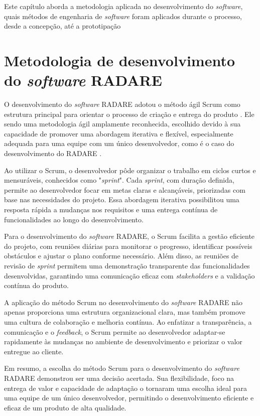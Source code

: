 \label{Cap:Metodologia}

Este capítulo aborda a metodologia aplicada no desenvolvimento do \textit{software}, quais métodos de engenharia de \textit{software} foram aplicados durante o processo, desde a concepção, até a prototipação

\section{Metodologia de desenvolvimento do \textit{software} RADARE}

O desenvolvimento do \textit{software} RADARE adotou o método ágil Scrum como estrutura principal para orientar o processo de criação e entrega do produto \cite{softwareengreq}. Ele sendo uma metodologia ágil amplamente reconhecida, escolhido devido à sua capacidade de promover uma abordagem iterativa e flexível, especialmente adequada para uma equipe com um único desenvolvedor, como é o caso do desenvolvimento do RADARE \cite{scrum}.

Ao utilizar o Scrum, o desenvolvedor pôde organizar o trabalho em ciclos curtos e mensuráveis, conhecidos como "\textit{sprint}". Cada \textit{sprint}, com duração definida, permite ao desenvolvedor focar em metas claras e alcançáveis, priorizadas com base nas necessidades do projeto. Essa abordagem iterativa possibilitou uma resposta rápida a mudanças nos requisitos e uma entrega contínua de funcionalidades ao longo do desenvolvimento.
        
Para o desenvolvimento do \textit{software} RADARE, o Scrum facilita a gestão eficiente do projeto, com reuniões diárias para monitorar o progresso, identificar possíveis obstáculos e ajustar o plano conforme necessário. Além disso, as reuniões de revisão de \textit{sprint} permitem uma demonstração transparente das funcionalidades desenvolvidas, garantindo uma comunicação eficaz com \textit{stakeholders} e a validação contínua do produto.
        
A aplicação do método Scrum no desenvolvimento do \textit{software} RADARE não apenas proporciona uma estrutura organizacional clara, mas também promove uma cultura de colaboração e melhoria contínua. Ao enfatizar a transparência, a comunicação e o \textit{feedback}, o Scrum permite ao desenvolvedor adaptar-se rapidamente às mudanças no ambiente de desenvolvimento e priorizar o valor entregue ao cliente.
        
Em resumo, a escolha do método Scrum para o desenvolvimento do \textit{software} RADARE demonstrou ser uma decisão acertada. Sua flexibilidade, foco na entrega de valor e capacidade de adaptação o tornaram uma escolha ideal para uma equipe de um único desenvolvedor, permitindo o desenvolvimento eficiente e eficaz de um produto de alta qualidade.
        

